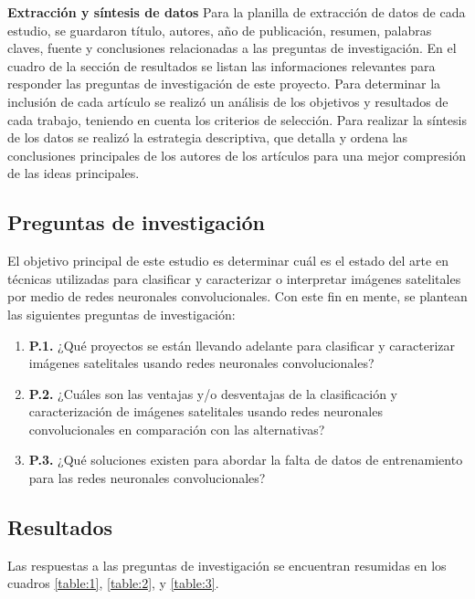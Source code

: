 {\bf Extracción y síntesis de datos} Para la planilla de extracción de datos de cada estudio, se guardaron título,
autores, año de publicación, resumen, palabras claves, fuente y conclusiones relacionadas a las preguntas de
investigación. En el cuadro de la sección de resultados se listan las informaciones relevantes para responder las
preguntas de investigación de este proyecto. Para determinar la inclusión de cada artículo se realizó un análisis de
los objetivos y resultados de cada trabajo, teniendo en cuenta los criterios de selección. Para realizar la síntesis de
los datos se realizó la estrategia descriptiva, que detalla y ordena las conclusiones principales de los autores de los
artículos para una mejor compresión de las ideas principales.

\subsection{Preguntas de investigación}

El objetivo principal de este estudio es determinar cuál es el estado del arte en técnicas utilizadas para clasificar y
caracterizar o interpretar imágenes satelitales por medio de redes neuronales convolucionales. Con este fin en mente,
se plantean las siguientes preguntas de investigación:

\begin{enumerate}
    \item[] {\bf P.1.} ¿Qué proyectos se están llevando adelante para clasificar y caracterizar imágenes satelitales
        usando redes neuronales convolucionales?
    \item[] {\bf P.2.} ¿Cuáles son las ventajas y/o desventajas de la clasificación y caracterización de imágenes
        satelitales usando redes neuronales convolucionales en comparación con las alternativas?
    \item[] {\bf P.3.} ¿Qué soluciones existen para abordar la falta de datos de entrenamiento para las redes
        neuronales convolucionales?
\end{enumerate}

\subsection{Resultados}

Las respuestas a las preguntas de investigación se encuentran resumidas en los cuadros \ref{table:1}, \ref{table:2}, y
\ref{table:3}.


